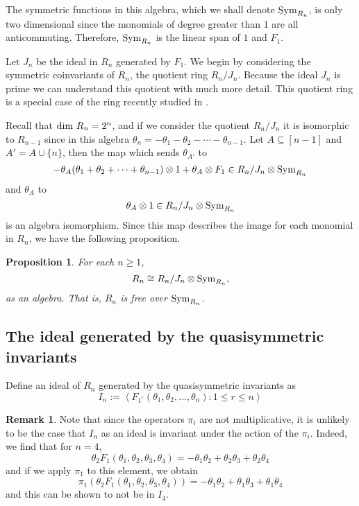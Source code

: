 \documentclass[11pt]{amsart}
\newtheorem{prop}[theorem]{Proposition}
\theoremstyle{definition}
\newtheorem{remark}[theorem]{Remark}
\numberwithin{equation}{section}
\begin{document}
The symmetric functions in this algebra, which we shall denote ${\rm Sym}_{R_n}$,
is only two dimensional since the monomials of degree greater than $1$
are all anticommuting.  Therefore, ${\rm Sym}_{R_n}$ is the linear span of $1$ and $F_1$.

Let $J_n$ be the ideal in $R_n$ generated by $F_1$.
We begin by considering the symmetric
coinvariants of $R_n$, the quotient ring $R_n/J_n$.
Because the ideal $J_n$ is prime we can
understand this quotient with much more detail.
This quotient ring is a special case of the ring
recently studied in \cite{IRR,KR}.

Recall that ${\rm dim}~R_n = 2^n$,
and if we consider the quotient $R_n/J_n$ it is isomorphic to $R_{n-1}$ since
in this algebra $\theta_n = - \theta_1 -\theta_2 - \cdots - \theta_{n-1}$.
Let $A \subseteq [n-1]$ and $A' = A \cup \{n\}$, then
the map which sends
$\theta_{A'}$ to
$$-\theta_{A}(\theta_1 + \theta_2 + \cdots + \theta_{n-1}) \otimes 1
+ \theta_{A} \otimes F_1 \in R_n/J_n \otimes {\rm Sym}_{R_n}$$
and $\theta_{A}$ to
$$\theta_{A} \otimes 1 \in R_n/J_n \otimes {\rm Sym}_{R_n}$$
is an algebra isomorphism.  Since this map describes the image
for each monomial in $R_n$, we have the following proposition.

\begin{prop} \label{prop:free}
For each $n \geq 1$,
$$R_n \cong R_n/J_n \otimes {\rm Sym}_{R_n},$$
as an algebra.  That is, $R_n$ is free over ${\rm Sym}_{R_n}$.
\end{prop}

\subsection{The ideal generated by the quasisymmetric invariants}

Define an ideal of $R_n$ generated by the quasisymmetric invariants as
\[
I_n := \left< F_{1^r}(\theta_1, \theta_2, \ldots, \theta_n) : 1 \leq r \leq n \right>
\]

\begin{remark}
Note that since the operators $\pi_i$ are not multiplicative, it
is unlikely to be the case that $I_n$ as an ideal is invariant
under the action of the $\pi_i$.  Indeed, we find that for $n=4$,
\[
\theta_2 F_{1}(\theta_1, \theta_2, \theta_3, \theta_4) =
-\theta_1 \theta_2 + \theta_2 \theta_3 + \theta_2 \theta_4
\]
and if we apply $\pi_1$ to this element, we obtain
\[
\pi_1(\theta_2 F_{1}(\theta_1, \theta_2, \theta_3, \theta_4)) =
-\theta_1 \theta_2 + \theta_1 \theta_3 + \theta_1 \theta_4
\]
and this can be shown to not be in $I_4$.
\end{remark}
\end{document}
